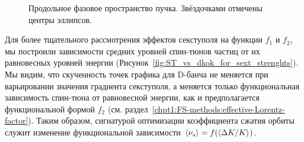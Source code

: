 \begin{figure}[h]
	\centering
	\caption[Продольное фазовое пространство пучка. Звёздочками отмечены центры эллипсов]{Продольное фазовое пространство пучка. Звёздочками отмечены центры эллипсов.\label{fig:long_PS_sext_settings}}
\end{figure}

Для более тщательного рассмотрения эффектов секступоля на функции $f_1$ и $f_2$, мы построили зависимости средних уровней спин-тюнов частиц от их равновесных уровней энергии (Рисунок~\ref{fig:ST_vs_dkok_for_sext_strenghts}). Мы видим, что скученность точек графика для D-банча не меняется при варьировании значения градиента секступоля, а меняется только функциональная зависимость спин-тюна от равновесной энергии, как и предполагается функциональной формой $f_2$ (см. раздел~\ref{chpt1:FS-methods:effective-Lorentz-factor}). Таким образом, сигнатурой оптимизации коэффициента сжатия орбиты служит изменение функциональной зависимости $\avg{\nu_s} = f(\avg{\Delta K/K})$.

